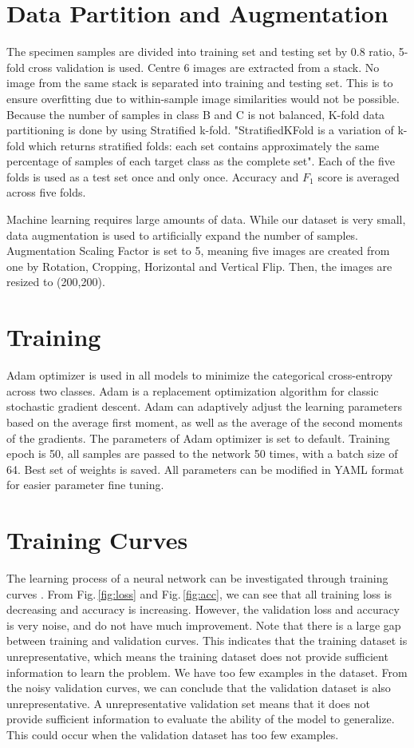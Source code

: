 \section{Data Partition and Augmentation}
The specimen samples are divided into training set and testing set by 0.8 ratio, 5-fold cross validation is used. Centre 6 images are extracted from a stack. No image from the same stack is separated into training and testing set. This is to ensure overfitting due to within-sample image similarities would not be possible. Because the number of samples in class B and C is not balanced, K-fold data partitioning is done by using Stratified k-fold. "StratifiedKFold is a variation of k-fold which returns stratified folds: each set contains approximately the same percentage of samples of each target class as the complete set". Each of the five folds is used as a test set once and only once. Accuracy and $F_1$ score is averaged across five folds.

Machine learning requires large amounts of data. While our dataset is very small, data augmentation is used to artificially expand the number of samples. Augmentation Scaling Factor is set to 5, meaning five images are created from one by Rotation, Cropping, Horizontal and Vertical Flip. Then, the images are resized to (200,200).

\section{Training}
Adam \citep{adam} optimizer is used in all models to minimize the categorical cross-entropy across two classes. Adam is a replacement optimization algorithm for classic stochastic gradient descent. Adam can adaptively adjust the learning parameters based on the average first moment, as well as the average of the second moments of the gradients. The parameters of Adam optimizer is set to default. Training epoch is 50, all samples are passed to the network 50 times, with a batch size of 64. Best set of weights is saved. All parameters can be modified in YAML format for easier parameter fine tuning.


\section{Training Curves}
The learning process of a neural network can be investigated through training curves \citep{Anzanello2011}.
From Fig.\,\ref{fig:loss} and Fig.\,\ref{fig:acc}, we can see that all training loss is decreasing and accuracy is increasing. However, the validation loss and accuracy is very noise, and do not have much improvement. Note that there is a large gap between training and validation curves. This indicates that the training dataset is unrepresentative, which means the training dataset does not provide sufficient information to learn the problem. We have too few examples in the dataset. From the noisy validation curves, we can conclude that the validation dataset is also unrepresentative. A  unrepresentative validation set means that it does not provide sufficient information to evaluate the ability of the model to generalize. This could occur when the validation dataset has too few examples.

